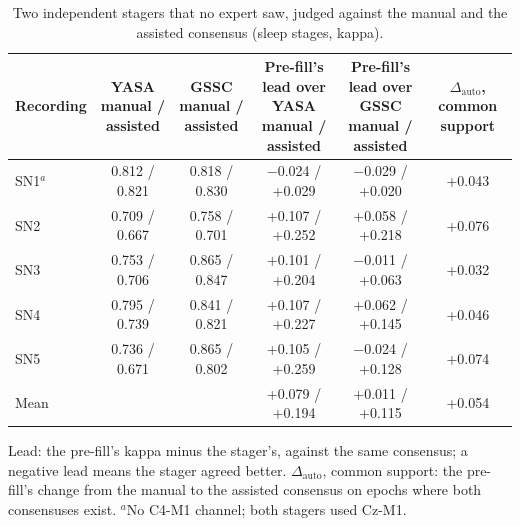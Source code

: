 \begin{table}[tbp]
\centering
\footnotesize
\caption{Two independent stagers that no expert saw, judged against the manual and the assisted consensus (sleep stages, kappa).}
\label{tab:stagers}
\begin{adjustbox}{max width=\linewidth}
\begin{tabular}{lccccc}
\toprule
Recording & \makecell{YASA\\manual / assisted} & \makecell{GSSC\\manual / assisted} & \makecell{Pre-fill's lead over YASA\\manual / assisted} & \makecell{Pre-fill's lead over GSSC\\manual / assisted} & \makecell{$\Delta_{\mathrm{auto}}$,\\common support} \\
\midrule
SN1$^{a}$ & 0.812 / 0.821 & 0.818 / 0.830 & \ensuremath{-}0.024 / +0.029 & \ensuremath{-}0.029 / +0.020 & +0.043 \\
SN2 & 0.709 / 0.667 & 0.758 / 0.701 & +0.107 / +0.252 & +0.058 / +0.218 & +0.076 \\
SN3 & 0.753 / 0.706 & 0.865 / 0.847 & +0.101 / +0.204 & \ensuremath{-}0.011 / +0.063 & +0.032 \\
SN4 & 0.795 / 0.739 & 0.841 / 0.821 & +0.107 / +0.227 & +0.062 / +0.145 & +0.046 \\
SN5 & 0.736 / 0.671 & 0.865 / 0.802 & +0.105 / +0.259 & \ensuremath{-}0.024 / +0.128 & +0.074 \\
Mean &  &  & +0.079 / +0.194 & +0.011 / +0.115 & +0.054 \\
\bottomrule
\end{tabular}
\end{adjustbox}
\par\smallskip
\begin{minipage}{0.95\linewidth}\footnotesize Lead: the pre-fill's kappa minus the stager's, against the same consensus; a negative lead means the stager agreed better. $\Delta_{\mathrm{auto}}$, common support: the pre-fill's change from the manual to the assisted consensus on epochs where both consensuses exist. $^{a}$No C4-M1 channel; both stagers used Cz-M1.\end{minipage}
\end{table}

